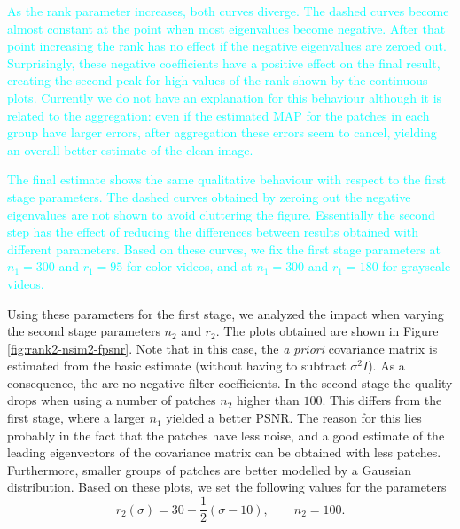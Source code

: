 \documentclass[10pt, journal, twocolumn, final, a4paper]{IEEEtran}
\newcommand{\pa}[1]{\textcolor{cyan}{#1}}
\newcommand{\padd}[1]{\pa{#1}}
\newcommand{\pcomment}[1]{}
\begin{document}
\padd{As the rank parameter increases, both curves diverge. 
The dashed curves become almost constant at the point when
most eigenvalues become negative. After that point increasing the
rank has no effect if the negative eigenvalues are zeroed out.
%
Surprisingly, these negative coefficients have a positive effect on the final 
result, creating the second peak for high values of the rank shown by the
continuous plots. Currently we do not have an explanation for this behaviour
although it is related to the aggregation: even if the estimated MAP for the
patches in each group have larger errors, after aggregation these errors seem
to cancel, yielding an overall better estimate of the clean image.}

\padd{The final estimate shows the same qualitative behaviour with respect to the first
stage parameters. The dashed curves obtained by zeroing out the negative
eigenvalues are not shown to avoid cluttering the figure. Essentially the
second step has the effect of reducing the differences between results obtained
with different parameters. Based on these curves, we fix the first stage parameters at
$n_1 = 300$ and $r_1 = 95$ for color videos, and at $n_1 = 300$ and $r_1 = 180$ for grayscale videos.}

Using these parameters for the first stage, we analyzed the impact when varying the second stage
parameters $n_2$ and $r_2$. The plots obtained are shown in Figure
\ref{fig:rank2-nsim2-fpsnr}.
%
Note that in this case, the \emph{a
priori} covariance matrix is estimated from the basic estimate (without having
to subtract $\sigma^2I$). As a consequence, the are no negative filter coefficients.
%
In the second stage the quality drops when
using a number of patches $n_2$ higher than $100$. This differs from the first stage,
where a larger $n_1$ yielded a better PSNR.
The reason for this lies probably in the fact that the patches have less noise,
and a good estimate of the leading eigenvectors of the covariance matrix can be obtained
with less patches. Furthermore, smaller groups of patches
are better modelled by a Gaussian distribution.
Based on these plots, we set the following values for the parameters
\[r_2(\sigma) = 30 - \frac12(\sigma - 10),\quad\quad n_{2} = 100.\]
\end{document}
